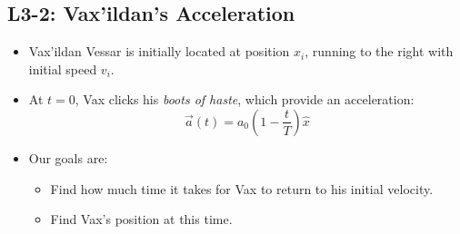 \documentclass[]{article}
\begin{document}
\newpage
\begin{TeacherMargin}

\end{TeacherMargin}
\begin{PresentSpace}
\vspace{-10pt}
\section*{L3-2: Vax'ildan's Acceleration}
\vspace{-20pt}
\begin{multicols}{2}
\begin{itemize}
	\item Vax'ildan Vessar is initially located at position $x_{i}$, running to the right with initial speed $v_{i}$.
	\item At $t=0$, Vax clicks his \textit{boots of haste}, which provide an acceleration:
	\vspace{-10pt}
	\[
	\vec{a}(t) = a_{0}\left(1-\frac{t}{T}\right)\hat{x}
	\]
	\vspace{-20pt}
	\item Our goals are:
	\begin{itemize}
		\item Find how much time it takes for Vax to return to his initial velocity.
		\item Find Vax's position at this time.
	\end{itemize}
\end{itemize}
\begin{center}

\end{center}
\end{multicols}
\end{PresentSpace}
\end{document}
